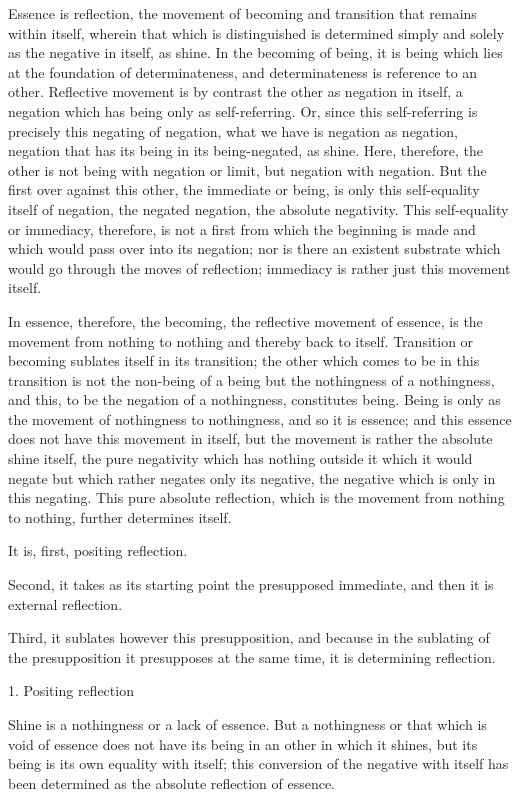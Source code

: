 Essence is reflection, the movement of becoming and transition
that remains within itself, wherein that which is distinguished is
determined simply and solely as the negative in itself, as shine.
In the becoming of being, it is being which lies
at the foundation of determinateness,
and determinateness is reference to an other.
Reflective movement is by contrast the other as negation in itself,
a negation which has being only as self-referring.
Or, since this self-referring is precisely this negating of negation,
what we have is negation as negation,
negation that has its being in its being-negated, as shine.
Here, therefore, the other is not being with negation or limit,
but negation with negation.
But the first over against this other, the immediate or being,
is only this self-equality itself of negation,
the negated negation, the absolute negativity.
This self-equality or immediacy, therefore, is
not a first from which the beginning is made
and which would pass over into its negation;
nor is there an existent substrate which would
go through the moves of reflection;
immediacy is rather just this movement itself.

In essence, therefore, the becoming,
the reflective movement of essence,
is the movement from nothing to nothing
and thereby back to itself.
Transition or becoming sublates itself in its transition;
the other which comes to be in this transition is
not the non-being of a being but the nothingness of a nothingness,
and this, to be the negation of a nothingness, constitutes being.
Being is only as the movement of nothingness to nothingness,
and so it is essence;
and this essence does not have this movement in itself,
but the movement is rather the absolute shine itself,
the pure negativity which has nothing outside it
which it would negate but which rather negates only its negative,
the negative which is only in this negating.
This pure absolute reflection, which is the movement
from nothing to nothing, further determines itself.

It is, first, positing reflection.

Second, it takes as its starting point the presupposed immediate,
and then it is external reflection.

Third, it sublates however this presupposition,
and because in the sublating of the presupposition
it presupposes at the same time,
it is determining reflection.

1. Positing reflection

Shine is a nothingness or a lack of essence.
But a nothingness or that which is void of essence
does not have its being in an other in which it shines,
but its being is its own equality with itself;
this conversion of the negative with itself has been determined
as the absolute reflection of essence.

